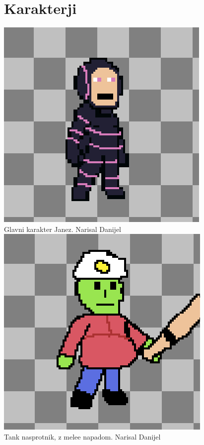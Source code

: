 \documentclass[a4paper]{article}
\begin{document}
\section{Karakterji}
\includegraphics[scale=0.5]{janez.png}
\\
Glavni karakter Janez. Narisal Danijel
\\
\includegraphics[scale=0.5]{melee.png}
\\
Tank nasprotnik, z melee napadom. Narisal Danijel
\\
\end{document}
